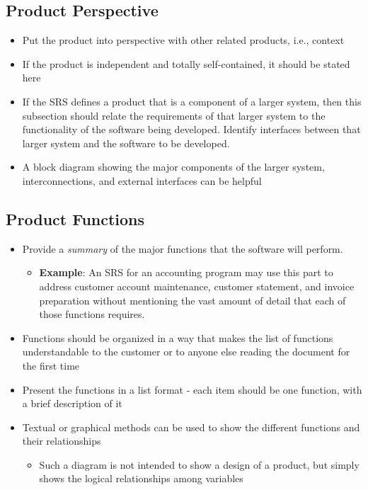 \documentclass[]{article}
\begin{document}
\subsection{Product Perspective}
\label{sub:product_perspective}
\begin{itemize}
	\item Put the product into perspective with other related products, i.e., context
	\item If the product is independent and totally self-contained, it should be stated here
	\item If the SRS defines a product that is a component of a larger system, then this subsection should relate the requirements of that larger system to the functionality of the software being developed. Identify interfaces between that larger system and the software to be developed.
	\item A block diagram showing the major components of the larger system, interconnections, and external interfaces can be helpful
\end{itemize}

\subsection{Product Functions}
\label{sub:product_functions}
\begin{itemize}
	\item Provide a \emph{summary} of the major functions that the software will perform.
	\begin{itemize}
		\item \textbf{Example}: An SRS for an accounting program may use this part to address customer account maintenance, customer statement, and invoice preparation without mentioning the vast amount of detail that each of those functions requires.
	\end{itemize}
	\item Functions should be organized in a way that makes the list of functions understandable to the customer or to anyone else reading the document for the first time 
	\item Present the functions in a list format - each item should be one function, with a brief description of it
	\item Textual or graphical methods can be used to show the different functions and their relationships
	\begin{itemize}
		\item Such a diagram is not intended to show a design of a product, but simply shows the logical relationships among variables
	\end{itemize} 
\end{itemize}
\end{document}
